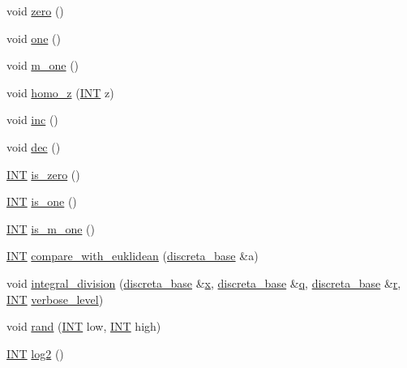 \begin{DoxyCompactItemize}
void \mbox{\hyperlink{classinteger_ab99e796e5c2cef13eb30dc43eac3c9fe}{zero}} ()
\item 
void \mbox{\hyperlink{classinteger_a18a967d90d63b1c58e3f2480e9084ed5}{one}} ()
\item 
void \mbox{\hyperlink{classinteger_a4d312656ed6c31235e11ecb3f05df1f5}{m\+\_\+one}} ()
\item 
void \mbox{\hyperlink{classinteger_ab975244fc25d0a9b3d4ef5104e3fcd24}{homo\+\_\+z}} (\mbox{\hyperlink{galois_8h_a09fddde158a3a20bd2dcadb609de11dc}{I\+NT}} z)
\item 
void \mbox{\hyperlink{classinteger_a2fd161f380ea688219131ba9a8429509}{inc}} ()
\item 
void \mbox{\hyperlink{classinteger_a6b744350afb55f82d25e55bb6b1027b2}{dec}} ()
\item 
\mbox{\hyperlink{galois_8h_a09fddde158a3a20bd2dcadb609de11dc}{I\+NT}} \mbox{\hyperlink{classinteger_ab92500013b2342ab5c24355bc91bad64}{is\+\_\+zero}} ()
\item 
\mbox{\hyperlink{galois_8h_a09fddde158a3a20bd2dcadb609de11dc}{I\+NT}} \mbox{\hyperlink{classinteger_acf8faabd4ed20f9580605714b5b73a5f}{is\+\_\+one}} ()
\item 
\mbox{\hyperlink{galois_8h_a09fddde158a3a20bd2dcadb609de11dc}{I\+NT}} \mbox{\hyperlink{classinteger_a7585957656c1152035411e066a4f0053}{is\+\_\+m\+\_\+one}} ()
\item 
\mbox{\hyperlink{galois_8h_a09fddde158a3a20bd2dcadb609de11dc}{I\+NT}} \mbox{\hyperlink{classinteger_a903a43b71a9f65f6b7edb443997f5f0e}{compare\+\_\+with\+\_\+euklidean}} (\mbox{\hyperlink{classdiscreta__base}{discreta\+\_\+base}} \&a)
\item 
void \mbox{\hyperlink{classinteger_ac6b2f247cfac1e1e5708a9e035ce42fe}{integral\+\_\+division}} (\mbox{\hyperlink{classdiscreta__base}{discreta\+\_\+base}} \&\mbox{\hyperlink{alphabet2_8_c_a6150e0515f7202e2fb518f7206ed97dc}{x}}, \mbox{\hyperlink{classdiscreta__base}{discreta\+\_\+base}} \&\mbox{\hyperlink{simeon_8_c_a92cbb483a3b27ae1a0dbfcb125ce216f}{q}}, \mbox{\hyperlink{classdiscreta__base}{discreta\+\_\+base}} \&\mbox{\hyperlink{alphabet2_8_c_acab531abaa74a7e664e3986f2522b33a}{r}}, \mbox{\hyperlink{galois_8h_a09fddde158a3a20bd2dcadb609de11dc}{I\+NT}} \mbox{\hyperlink{simeon_8_c_a818073fbcc2f439e7c56952f67386122}{verbose\+\_\+level}})
\item 
void \mbox{\hyperlink{classinteger_a672d4d45d9d68997770f1cb86f966912}{rand}} (\mbox{\hyperlink{galois_8h_a09fddde158a3a20bd2dcadb609de11dc}{I\+NT}} low, \mbox{\hyperlink{galois_8h_a09fddde158a3a20bd2dcadb609de11dc}{I\+NT}} high)
\item 
\mbox{\hyperlink{galois_8h_a09fddde158a3a20bd2dcadb609de11dc}{I\+NT}} \mbox{\hyperlink{classinteger_af03f36df78aa755b9e4c7eaecc3b5f44}{log2}} ()
\end{DoxyCompactItemize}
